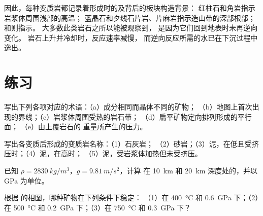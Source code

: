 因此，每种变质岩都记录着形成时的及背后的板块构造背景：
红柱石和角岩指示岩浆体周围浅部的高温；
蓝晶石和夕线石片岩、片麻岩指示造山带的深部根部；
和则指示。
大多数此类岩石之所以能被观察到，
是因为它们回到地表时未再逆向变化。
岩石上升并冷却时，反应速率减慢，
而逆向反应所需的水已在下沉过程中逸出。

\section{练习}

\begin{exercise}[$\star$]\label{exo:g12:metamorphic-rocks:1}
写出下列各项对应的术语：（a）成分相同而晶体不同的矿物；
（b）地图上首次出现的界线；（c）岩浆体周围受热的岩石带；
（d）扁平矿物定向排列形成的平行面；
（e）由上覆岩石的
重量所产生的压力。
\end{exercise}

\begin{exercise}[$\star$]\label{exo:g12:metamorphic-rocks:2}
写出各变质后形成的变质岩名称：（1）石灰岩；
（2）砂岩；（3）泥，在低且受挤压时；（4）泥，在高时；
（5）泥，受岩浆体加热但未受挤压。
\end{exercise}

\begin{exercise}[$\star$]\label{exo:g12:metamorphic-rocks:3}
已知 $\rho = \qty{2830}{kg/m^3}$，$g = \qty{9.81}{m/s^2}$，计算
在 \qty{10}{km} 和 \qty{20}{km} 深度处的，并以 \unit{GPa} 为单位。
\end{exercise}

\begin{exercise}[$\star$]\label{exo:g12:metamorphic-rocks:4}
根据  的相图，哪种矿物在下列条件下稳定：
（1）在 \qty{400}{\celsius} 和 \qty{0.6}{GPa} 下；（2）在 \qty{500}{\celsius}
和 \qty{0.2}{GPa} 下；（3）在 \qty{750}{\celsius} 和 \qty{0.3}{GPa} 下？
\end{exercise}

